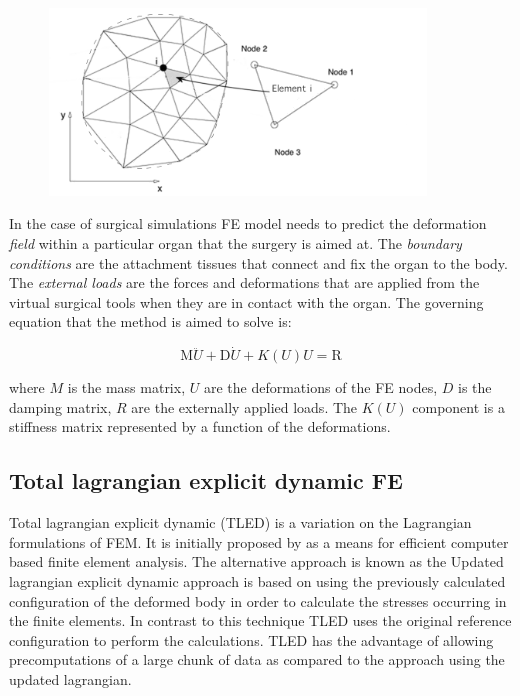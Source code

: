\begin{figure}
\begin{center}
\includegraphics[width=100mm]{sections/methodology/images/fea/fea.png}
\caption[Finite element partitioning.]{\label{fea-fea}}
\end{center}
\end{figure}

In the case of surgical simulations FE model needs to predict the deformation \textit{field} within a particular organ that the surgery is aimed at. The \textit{boundary conditions} are the attachment tissues that connect and fix the organ to the body. The \textit{external loads} are the forces and deformations that are applied from the virtual surgical tools when they are in contact with the organ. The governing equation that the method is aimed to solve is:

\begin{equation}
\label{eq-governing}
\textrm{M} \ddot{U} + \textrm{D}\dot{U} + K(U)U = \textrm{R}
\end{equation}

where $M$ is the mass matrix, $U$ are the deformations of the FE nodes, $D$ is the damping matrix, $R$ are the externally applied loads. The $K(U)$ component is a stiffness matrix represented by a function of the deformations.

\subsection{Total lagrangian explicit dynamic FE}

  Total lagrangian explicit dynamic (TLED) is a variation on the Lagrangian formulations of FEM. It is initially proposed by \cite{Miller2007} as a means for efficient computer based finite element analysis. The alternative approach is known as the Updated lagrangian explicit dynamic approach is based on using the previously calculated configuration of the deformed body in order to calculate the stresses occurring in the finite elements. In contrast to this technique TLED uses the original reference configuration to perform the calculations. TLED has the advantage of allowing precomputations of a large chunk of data as compared to the approach using the updated lagrangian.

